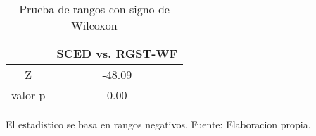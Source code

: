 \begin{table}[H]
\centering
\begin{tabular}{c|c|}
\cline{2-2}
                              & SCED vs. RGST-WF \\ \hline
\multicolumn{1}{|c|}{Z}       & -48.09          \\ \hline
\multicolumn{1}{|c|}{valor-p} & 0.00           \\ \hline
\end{tabular}
\caption{Prueba de rangos con signo de Wilcoxon}
El estadistico  se basa en rangos negativos. Fuente: Elaboracion propia.
\label{wilTable}
\end{table}
